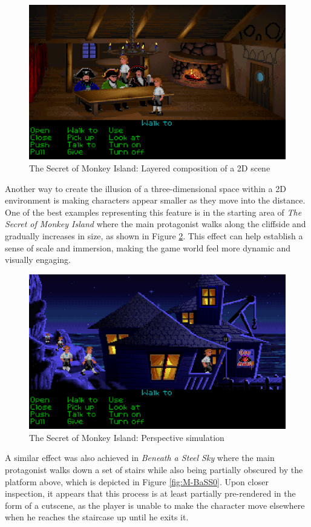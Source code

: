 \begin{figure}[H]
\centering
\includegraphics[width=.8\linewidth]{img/M-TSoMI0.png}
\caption{The Secret of Monkey Island: Layered composition of a 2D scene}
\label{fig:M-TSoMI0}
\end{figure}

Another way to create the illusion of a three-dimensional space within a 2D environment is making characters appear smaller as they move into the distance. One of the best examples representing this feature is in the starting area of \textit{The Secret of Monkey Island} where the main protagonist walks along the cliffside and gradually increases in size, as shown in Figure \ref{fig:M-TSoMI}. This effect can help establish a sense of scale and immersion, making the game world feel more dynamic and visually engaging. 

\begin{figure}[H]
\centering
\includegraphics[width=.8\linewidth]{img/M-TSoMI.png}
\caption{The Secret of Monkey Island: Perspective simulation}
\label{fig:M-TSoMI}
\end{figure}

A similar effect was also achieved in \textit{Beneath a Steel Sky} where the main protagonist walks down a set of stairs while also being partially obscured by the platform above, which is depicted in Figure \ref{fig:M-BaSS0}.  Upon closer inspection, it appears that this process is at least partially pre-rendered in the form of a cutscene, as the player is unable to make the character move elsewhere when he reaches the staircase up until he exits it. 

